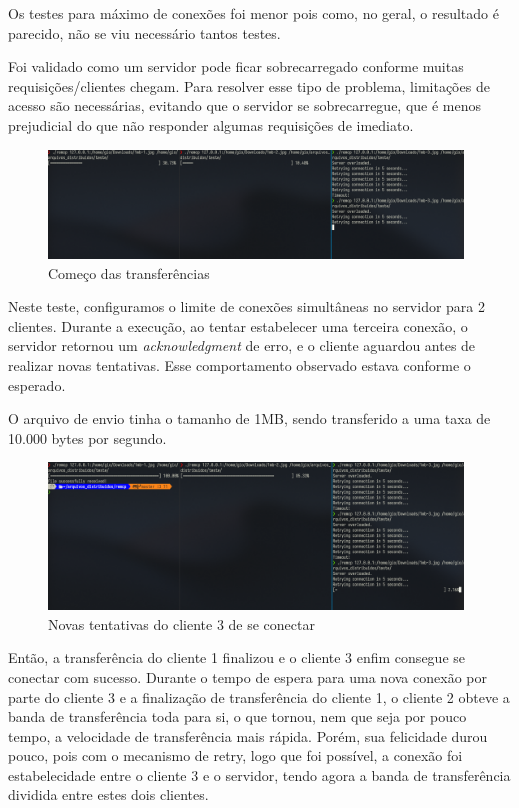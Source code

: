 \documentclass{article}
\begin{document}
Os testes para máximo de conexões foi menor pois como, no geral, o resultado é parecido, não se viu necessário tantos testes.

Foi validado como um servidor pode ficar sobrecarregado conforme muitas requisições/clientes chegam. Para resolver esse tipo de
problema, limitações de acesso são necessárias, evitando que o servidor se sobrecarregue, que é menos prejudicial do que não responder algumas requisições de
imediato.

\begin{figure}[H]
	\centering
	\includegraphics[width=0.98\textwidth]{run-1.png}
	\caption{Começo das transferências}
\end{figure}

Neste teste, configuramos o limite de conexões simultâneas no servidor para 2 clientes. Durante a execução, ao tentar estabelecer uma terceira conexão,
o servidor retornou um \textit{acknowledgment} de erro, e o cliente aguardou antes de realizar novas tentativas. Esse comportamento observado estava
conforme o esperado.

O arquivo de envio tinha o tamanho de 1MB, sendo transferido a uma taxa de 10.000 bytes por segundo.

\begin{figure}[H]
	\centering
	\includegraphics[width=0.98\textwidth]{run-2.png}
	\caption{Novas tentativas do cliente 3 de se conectar}
\end{figure}

Então, a transferência do cliente 1 finalizou e o cliente 3 enfim consegue se conectar com sucesso. Durante o tempo de espera para uma nova conexão por
parte do cliente 3 e a finalização de transferência do cliente 1, o cliente 2 obteve a banda de transferência toda para si, o que tornou, nem que seja
por pouco tempo, a velocidade de transferência mais rápida. Porém, sua felicidade durou pouco, pois com o mecanismo de retry, logo que foi possível,
a conexão foi estabelecidade entre o cliente 3 e o servidor, tendo agora a banda de transferência dividida entre estes dois clientes.
\end{document}
